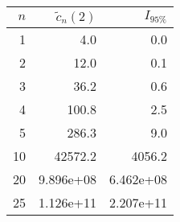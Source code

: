 \begin{tabular}{rrr}
\toprule
 $n$ &  $\tilde{c}_n(2)$ &  $I_{95\%}$ \\
\midrule
   1 &               4.0 &         0.0 \\
   2 &              12.0 &         0.1 \\
   3 &              36.2 &         0.6 \\
   4 &             100.8 &         2.5 \\
   5 &             286.3 &         9.0 \\
  10 &           42572.2 &      4056.2 \\
  20 &         9.896e+08 &   6.462e+08 \\
  25 &         1.126e+11 &   2.207e+11 \\
\bottomrule
\end{tabular}
